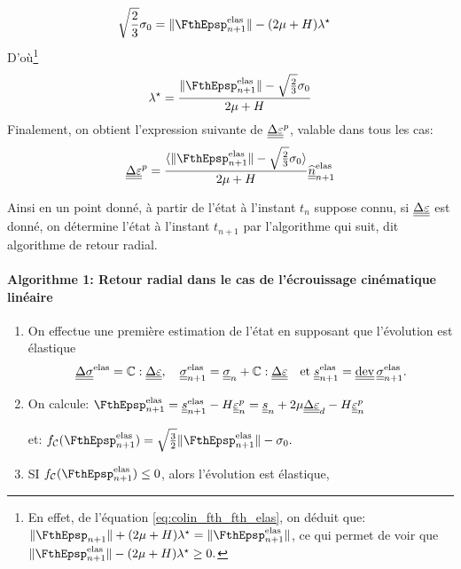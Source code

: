 \documentclass[10pt]{book}
\begin{document}
\begin{appendices}
\begin{Demo}
{$$\begin{aligned}
\sqrt{\frac{2}{3}}\sigma_{0}&=\Vert\FthEpsp_{n+1}^{\text{elas}}\Vert-(2\mu+H)\lambda^{\star}
\end{aligned}$$
D'où\footnote{ En effet, de l'équation \eqref{eq:colin_fth_fth_elas}, on déduit que: $\Vert \FthEpsp_{n+1}\Vert+(2\mu+H)\lambda^{\star}=\Vert\FthEpsp_{n+1}^{\text{elas}}\Vert$, ce qui permet de voir que $\Vert\FthEpsp_{n+1}^{\text{elas}}\Vert-(2\mu+H)\lambda^{\star}\geq 0.$}
$$ \lambda^{\star}=\frac{\Vert \FthEpsp_{n+1}^{\text{elas}}\Vert-\sqrt{\frac{2}{3}}\sigma_{0}}{2\mu+H}$$
Finalement, on obtient l'expression suivante de $\underline{\underline{\Delta}}\underline{\underline{\varepsilon}}^{p}$, valable dans tous les cas:
\begin{equation}
\DeltaEpsP=\frac{\langle\Vert\FthEpsp_{n+1}^{\text{elas}}\Vert-\sqrt{\frac{2}{3}}\sigma_{0}\rangle}{2\mu+H}\hat{\ten{n}}_{n+1}^{\text{elas}}
\label{eq:Correction_plastique_incre}
\end{equation}
}\end{Demo}
Ainsi en un point donné, à partir de l'état à l'instant $t_{n}$ suppose connu, si $\underline{\underline{\Delta}}\underline{\underline{\varepsilon}}$ est donné, on détermine l'état à l'instant $t_{n+1}$ par l'algorithme qui suit, dit algorithme de retour radial.
\paragraph{Algorithme 1: Retour radial dans le cas de l'écrouissage cinématique linéaire\\}
\begin{enumerate}
\item On effectue une première estimation de l'état en supposant que l'évolution est élastique
$$\DeltaSC^{\text{elas}}=\RigiLin:\DeltaDefoHPP, \quad \SC_{n+1}^{\text{elas}}=\SC_{n}+\RigiLin:\DeltaDefoHPP \quad \text{et} \; \devia^{\text{elas}}_{n+1}=\dev\SC^{\text{elas}}_{n+1}.$$
\item On calcule: $\FthEpsp_{n+1}^{\text{elas}}=\devia_{n+1}^{\text{elas}}-H\DefoHPP_{n}^{p}=\devia_{n}+2\mu\DeltaDefoHPP_{d}-H\DefoHPP^{p}_{n}$
\begin{center}
et: $\FChargeConvexe(\FthEpsp_{n+1}^{\text{elas}})=\sqrt{\frac{3}{2}}\Vert\FthEpsp_{n+1}^{\text{elas}}\Vert-\sigma_{0}.$
\end{center}
\item SI $\FChargeConvexe(\FthEpsp_{n+1}^{\text{elas}})\leq 0$, alors l'évolution est élastique,\\


\end{enumerate}
\end{appendices}
\end{document}
